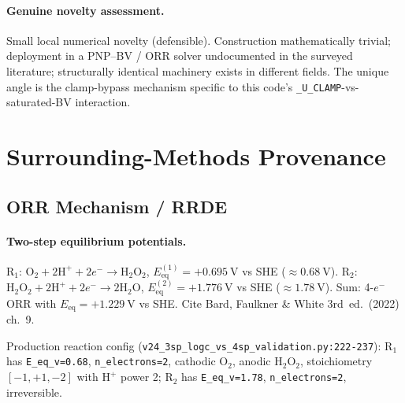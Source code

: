 \documentclass[11pt]{article}
\newcommand{\Eeq}{E_{\mathrm{eq}}}
\newcommand{\Hpe}{\mathrm{H}^{+}}
\newcommand{\HtwoOtwo}{\mathrm{H}_2\mathrm{O}_2}
\begin{document}
\paragraph{Genuine novelty assessment.}
Small local numerical novelty (defensible). Construction mathematically
trivial; deployment in a PNP--BV / ORR solver undocumented in the surveyed
literature; structurally identical machinery exists in different fields. The
unique angle is the clamp-bypass mechanism specific to this code's
\texttt{\_U\_CLAMP}-vs-saturated-BV interaction.

\section{Surrounding-Methods Provenance}

\subsection{ORR Mechanism / RRDE}

\paragraph{Two-step equilibrium potentials.}
$\mathrm{R}_1$: $\mathrm{O}_2+2\Hpe+2e^-\to\HtwoOtwo$,
$\Eeq^{(1)}=+\SI{0.695}{\volt}$ vs SHE ($\approx \SI{0.68}{\volt}$).
$\mathrm{R}_2$: $\HtwoOtwo+2\Hpe+2e^-\to 2\mathrm{H}_2\mathrm{O}$,
$\Eeq^{(2)}=+\SI{1.776}{\volt}$ vs SHE ($\approx \SI{1.78}{\volt}$). Sum: 4-$e^-$
ORR with $\Eeq=+\SI{1.229}{\volt}$ vs SHE. Cite Bard, Faulkner \& White 3rd~ed.\
(2022) ch.~9.

Production reaction config
(\texttt{v24\_3sp\_logc\_vs\_4sp\_validation.py:222-237}): $\mathrm{R}_1$ has
\texttt{E\_eq\_v=0.68}, \texttt{n\_electrons=2}, cathodic $\mathrm{O}_2$,
anodic $\HtwoOtwo$, stoichiometry $[-1,+1,-2]$ with $\Hpe$ power 2;
$\mathrm{R}_2$ has \texttt{E\_eq\_v=1.78}, \texttt{n\_electrons=2},
irreversible.
\end{document}

